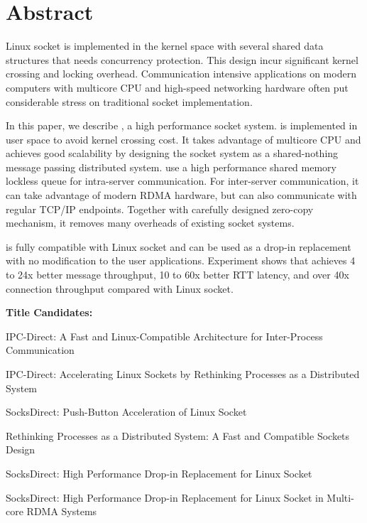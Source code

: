 \section*{Abstract}
Linux socket is implemented in the kernel space with several shared data structures that needs concurrency protection. 
This design incur significant kernel crossing and locking overhead. Communication intensive applications on
modern computers with multicore CPU and high-speed networking hardware often put considerable stress on traditional
socket implementation. 

In this paper, we describe \sys{}, a high performance socket system. 
\sys{} is implemented in user space to avoid kernel crossing cost. It takes advantage of multicore CPU and achieves
good scalability by designing the socket system as a shared-nothing message passing distributed system.
\sys{} use a high performance shared memory lockless queue for intra-server communication. For inter-server communication, 
it can take advantage of modern RDMA hardware, but can also communicate with regular TCP/IP endpoints.
Together with carefully designed zero-copy mechanism, it removes many overheads of existing socket systems. 

\sys{} is fully compatible with Linux socket and can be used as a drop-in replacement with no modification to the user applications. 
Experiment shows that \sys achieves 4 to 24x better message throughput, 10 to 60x better RTT latency, and over 40x connection 
throughput compared with Linux socket. 


\iffalse
\textbf{Title Candidates:}


IPC-Direct: A Fast and Linux-Compatible Architecture for Inter-Process Communication



IPC-Direct: Accelerating Linux Sockets by Rethinking Processes as a Distributed System

SocksDirect: Push-Button Acceleration of Linux Socket

Rethinking Processes as a Distributed System: A Fast and Compatible Sockets Design

SocksDirect: High Performance Drop-in Replacement for Linux Socket

SocksDirect: High Performance Drop-in Replacement for Linux Socket in Multi-core RDMA Systems

